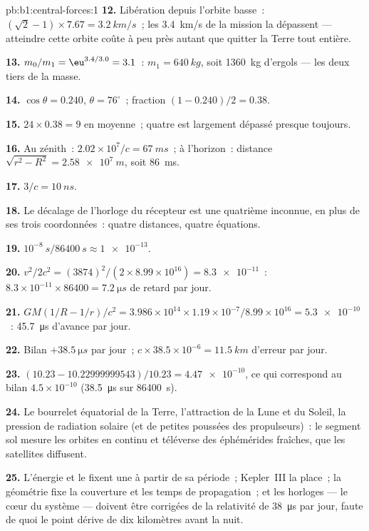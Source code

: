 \begin{solution}{pb:b1:central-forces:1}
\textbf{12.} Libération depuis l'orbite basse~: $(\sqrt2 - 1)\times 7.67 = \qty{3.2}{km/s}$~;
les \qty{3.4}{km/s} de la mission la dépassent --- atteindre cette orbite
coûte à peu près autant que quitter la Terre tout entière.

\textbf{13.} $m_0/m_1 = \eu^{3.4/3.0} = 3.1$~: $m_1 = \qty{640}{kg}$, soit
\qty{1360}{kg} d'ergols --- les deux tiers de la masse.

\textbf{14.} $\cos\theta = 0.240$, $\theta = 76^\circ$~; fraction $(1 - 0.240)/2
= 0.38$.

\textbf{15.} $24 \times 0.38 = 9$ en moyenne~; quatre est largement
dépassé presque toujours.

\textbf{16.} Au zénith~: $2.02\times10^7/c = \qty{67}{ms}$~; à l'horizon~:
distance $\sqrt{r^2 - R^2} = \qty{2.58e7}{m}$, soit \qty{86}{ms}.

\textbf{17.} $3/c = \qty{10}{ns}$.

\textbf{18.} Le décalage de l'horloge du récepteur est une quatrième
inconnue, en plus de ses trois coordonnées~: quatre distances, quatre équations.

\textbf{19.} $10^{-8}\ \unit{s}/\qty{86400}{s} \approx \num{1e-13}$.

\textbf{20.} $v^2/2c^2 = (3874)^2/(2 \times 8.99\times10^{16}) = \num{8.3e-11}$~:
$8.3\times10^{-11} \times 86400 = \qty{7.2}{\micro s}$ de retard par jour.

\textbf{21.} $GM(1/R - 1/r)/c^2 = 3.986\times10^{14} \times 1.19\times10^{-7}/
8.99\times10^{16} = \num{5.3e-10}$~: \qty{45.7}{\micro s} d'avance par jour.

\textbf{22.} Bilan $+\qty{38.5}{\micro s}$ par jour~; $c \times 38.5\times10^{-6}
= \qty{11.5}{km}$ d'erreur par jour.

\textbf{23.} $(10.23 - 10.22999999543)/10.23 = \num{4.47e-10}$, ce qui
correspond au bilan $4.5\times10^{-10}$ (\qty{38.5}{\micro s} sur \qty{86400}{s}).

\textbf{24.} Le bourrelet équatorial de la Terre, l'attraction de la
Lune et du Soleil, la pression de radiation solaire (et de petites
poussées des propulseurs)~: le segment sol mesure les orbites en continu
et téléverse des éphémérides fraîches, que les satellites diffusent.

\textbf{25.} L'énergie et le  fixent une  à partir de sa période~; Kepler~III la place~; la géométrie
fixe la couverture et les temps de propagation~; et les horloges --- le
cœur du système --- doivent être corrigées de la relativité de
\qty{38}{\micro s} par jour, faute de quoi le point dérive de dix
kilomètres avant la nuit.
\end{solution}
